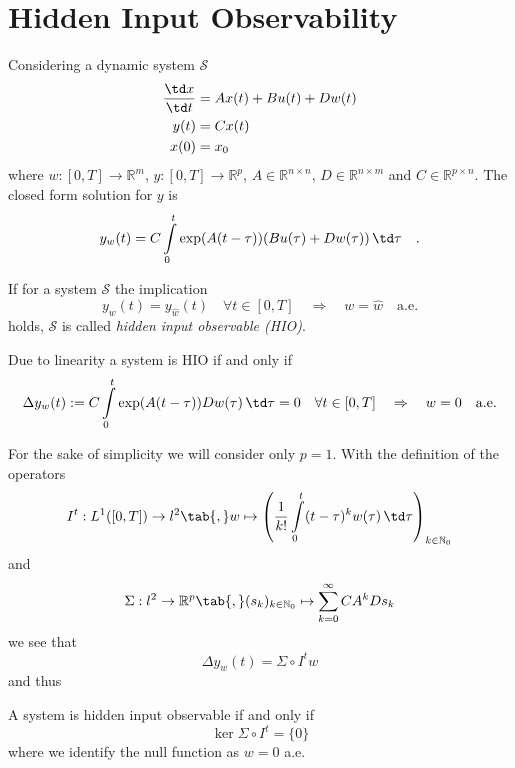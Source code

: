 \section{Hidden Input Observability}
Considering a dynamic system $\mathcal{S}$
\begin{align}
\frac{\td x}{\td t} &= Ax(t) + Bu(t) + Dw(t) \\
y(t) &= Cx(t) \\
x(0) &= x_0
\end{align}
where $w:[0,T]\rightarrow \mathbb{R}^m$, $y:[0,T]\rightarrow \mathbb{R}^p$, 
$A\in \mathbb{R}^{n\times n}$, $D\in\mathbb{R}^{n\times m}$ and $C\in\mathbb{R}^{p\times 
n}$. The 
closed form solution for $y$ is
\begin{equation}
y_w(t) = C \int\limits_0^t \exp(A(t-\tau)) (Bu(\tau) + Dw(\tau) ) \, \td 
\tau \quad .
\end{equation}

\begin{definition}
If for a system $\mathcal{S}$ the implication
\begin{equation}
y_{w}(t) = y_{\hat{w}}(t) \quad \forall t\in [0,T]
\quad \Rightarrow \quad 
 w = \hat{w} \quad \text{a.e.}
\end{equation}
holds, $\mathcal{S}$ is called \textit{hidden input observable (HIO)}.
\end{definition}


Due to linearity a system is HIO if and only if 
\begin{equation}
\Delta y_w(t) := C\int\limits_0^t \exp(A(t-\tau))Dw(\tau)\,\td\tau = 0 \quad 
\forall t\in[0,T] \quad \Rightarrow \quad 
w = 0 \quad \text{a.e.}
\end{equation}

For the sake of simplicity we will consider only $p=1$. With the 
definition of the operators
\begin{equation}
I^t:L^1([0,T]) \rightarrow l^2 \tab{,} w \mapsto \left( 
\frac{1}{k!} \int\limits_0^t (t-\tau)^k w(\tau) \, \td\tau
\right)_{k\in \mathbb{N}_0}
\end{equation}
and 
\begin{equation}
\Sigma:l^2 \rightarrow \mathbb{R}^p \tab{,} (s_k)_{k\in\mathbb{N}_0}
\mapsto \sum\limits_{k=0}^\infty C A^k D s_k
\end{equation}
we see that 
\begin{equation}
\Delta y_w(t) = \Sigma\circ I^t w 
\end{equation}
and thus
\begin{corollary}
A system is hidden input observable if and only if 
\begin{equation}
\ker{\Sigma \circ I^t} = \{0\} \label{eq:introduction:observable}
\end{equation}
where we identify the null function as $w=0$ a.e.
\end{corollary}